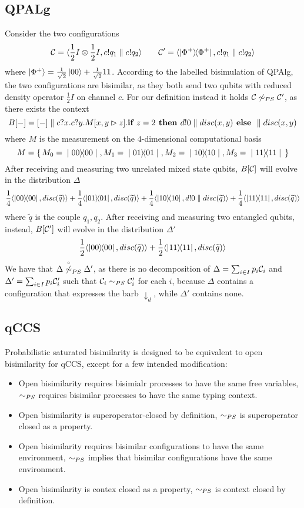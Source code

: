 
\subsection{QPALg}

Consider the two configurations
\[ \mathcal{C} = \langle\frac{1}{2}I \otimes \frac{1}{2}I, c!q_1 \parallel c!q_2\rangle \qquad \mathcal{C}' = \langle\ket{\Phi^+}\!\!\bra{\Phi^+}, c!q_1 \parallel c!q_2\rangle
\] where $\ket{\Phi^+} = \frac{1}{\sqrt{2}}\ket{00} + \frac{1}{\sqrt{2}}{11}$. According to the labelled bisimulation of QPAlg, the two configurations are bisimilar, as they both send two qubits with reduced density operator $\frac{1}{2}I$ on channel $c$. For our definition instead it holds $\mathcal{C} \not\sim_{PS} \mathcal{C}'$, as there exists the context \[B[{-}] = [{-}]\parallel c?x.c?y.M[x, y \rhd z].\textbf{if } z = 2 \textbf{ then } d!0 \parallel disc(x, y) \textbf{ else } \parallel disc(x, y)\] where $M$ is the measurement on the $4$-dimensional computational basis \[M = \set{M_0 = \proj{00}, M_1 = \proj{01}, M_2 = \proj{10}, M_3 = \proj{11}}\]
After receiving and measuring two unrelated mixed state qubits, $B[\mathcal{C}]$ will evolve in the distribution  $\Delta$
\[ \frac{1}{4}\confw{\proj{00}, disc(\widetilde{q})} + \frac{1}{4}\confw{\proj{01}, disc(\widetilde{q})} + \frac{1}{4}\confw{\proj{10}, d!0 \parallel disc(\widetilde{q})} + \frac{1}{4}\confw{\proj{11}, disc(\widetilde{q})} \] where $\widetilde{q}$ is the couple $q_1, q_2$.
After receiving and measuring two entangled qubits, instead, $B[\mathcal{C}']$ will evolve in the distribution $\Delta'$
\[ \frac{1}{2}\langle\ket{00}\!\!\bra{00}, disc(\widetilde{q})\rangle +  \frac{1}{2}\langle\ket{11}\!\!\bra{11}, disc(\widetilde{q})\rangle \] 
We have that $\Delta \stackrel{\scriptscriptstyle \circ}{\not\sim}_{PS} \Delta'$, as there is no decomposition of $\Delta = \sum_{i\in I} p_i \mathcal{C}_i$ and $\Delta' = \sum_{i\in I} p_i \mathcal{C}_i'$ such that $\mathcal{C}_i \sim_{PS} \mathcal{C}_i'$ for each $i$, because $\Delta$ contains a configuration that expresses the barb $\downarrow_d$, while $\Delta'$ contains none.

\subsection{qCCS}
Probabilistic saturated bisimilarity is designed to be equivalent to open bisimilarity for qCCS, except for a few intended modification:\begin{itemize}
\item Open bisimilarity requires bisimialr processes to have the same free variables, $\sim_{PS}$ requires bisimilar processes to have the same typing context.
\item Open bisimilarity is superoperator-closed by definition, $\sim_{PS}$ is superoperator closed as a property.
\item Open bisimilarity requires bisimilar configurations to have the same environment, $\sim_{PS}$ implies that bisimilar configurations have the same environment.
\item Open bisimilarity is contex closed as a property, $\sim_{PS}$ is context closed by definition.
\end{itemize}


